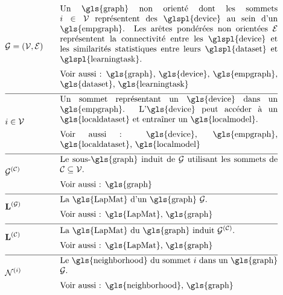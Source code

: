 \begin{align}
	&\graph = \pair{\nodes}{\edges} & \quad & \parbox{.75\textwidth}{
		Un \gls{graph} non orienté dont les sommets $\nodeidx \in \nodes$ représentent des \glspl{device} au sein d’un \gls{empgraph}. Les arêtes pondérées non orientées $\edges$ représentent la connectivité entre les \glspl{device} et les similarités statistiques entre leurs \glspl{dataset} et \glspl{learningtask}. \\
		[2mm] Voir aussi : \gls{graph}, \gls{device}, \gls{empgraph}, \gls{dataset}, \gls{learningtask}
	} \nonumber \\[2mm] \hline \nonumber\\[-5mm]
	&\nodeidx \in \nodes & \quad & \parbox{.75\textwidth}{
		Un sommet représentant un \gls{device} dans un \gls{empgraph}. L'\gls{device} peut accéder à un \gls{localdataset} et entraîner un \gls{localmodel}. \\
		[2mm] Voir aussi : \gls{device}, \gls{empgraph}, \gls{localdataset}, \gls{localmodel}
	} \nonumber \\[2mm] \hline \nonumber\\[-5mm]
	&\indsubgraph{\graph}{\cluster} & \quad & \parbox{.75\textwidth}{
		Le sous-\gls{graph} induit de $\graph$ utilisant les sommets de $\cluster \subseteq \nodes$. \\
		[2mm] Voir aussi : \gls{graph}
	} \nonumber \\[2mm] \hline \nonumber\\[-5mm]
	&\LapMat{\graph} & \quad & \parbox{.75\textwidth}{
		La \gls{LapMat} d’un \gls{graph} $\graph$. \\
		[2mm] Voir aussi : \gls{LapMat}, \gls{graph}
	} \nonumber \\[2mm] \hline \nonumber\\[-5mm]
	&\LapMat{\cluster} & \quad & \parbox{.75\textwidth}{
		La \gls{LapMat} du \gls{graph} induit $\indsubgraph{\graph}{\cluster}$. \\
		[2mm] Voir aussi : \gls{LapMat}, \gls{graph}
	} \nonumber \\[2mm] \hline \nonumber\\[-5mm]
	&\neighbourhood{\nodeidx} & \quad & \parbox{.75\textwidth}{
		Le \gls{neighborhood} du sommet $\nodeidx$ dans un \gls{graph} $\graph$. \\
		[2mm] Voir aussi : \gls{neighborhood}, \gls{graph}
	} \nonumber
\end{align}

